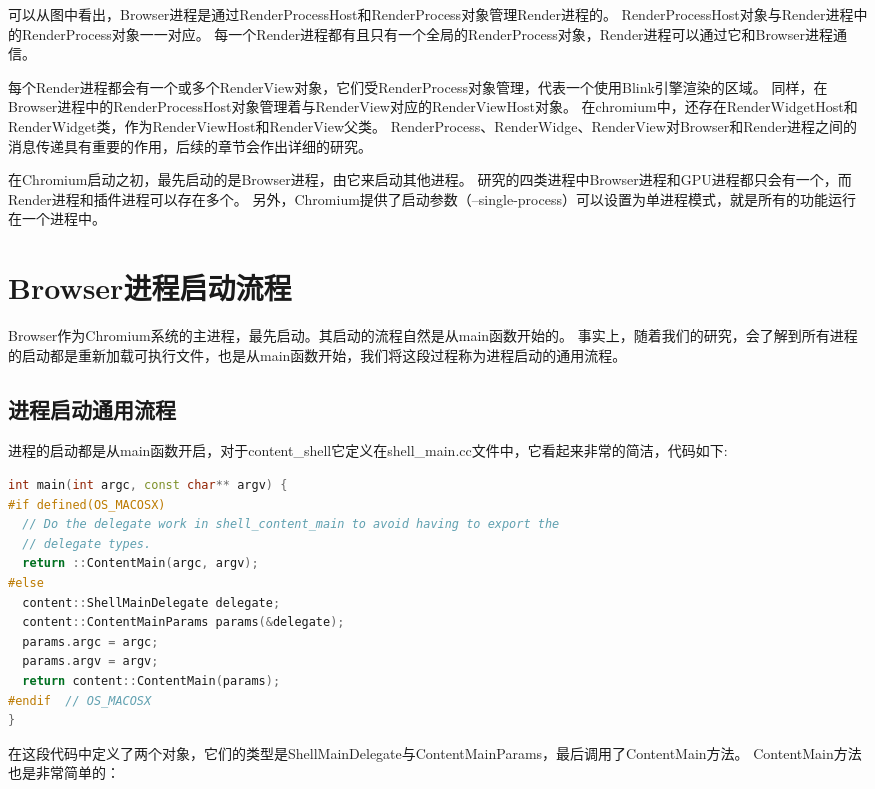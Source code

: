 可以从图中看出，Browser进程是通过RenderProcessHost和RenderProcess对象管理Render进程的。
RenderProcessHost对象与Render进程中的RenderProcess对象一一对应。
每一个Render进程都有且只有一个全局的RenderProcess对象，Render进程可以通过它和Browser进程通信。

每个Render进程都会有一个或多个RenderView对象，它们受RenderProcess对象管理，代表一个使用Blink引擎渲染的区域。
同样，在Browser进程中的RenderProcessHost对象管理着与RenderView对应的RenderViewHost对象。
在chromium中，还存在RenderWidgetHost和RenderWidget类，作为RenderViewHost和RenderView父类。
RenderProcess、RenderWidge、RenderView对Browser和Render进程之间的消息传递具有重要的作用，后续的章节会作出详细的研究。

在Chromium启动之初，最先启动的是Browser进程，由它来启动其他进程。
研究的四类进程中Browser进程和GPU进程都只会有一个，而Render进程和插件进程可以存在多个。
另外，Chromium提供了启动参数（--single-process）可以设置为单进程模式，就是所有的功能运行在一个进程中。

\section{Browser进程启动流程}
Browser作为Chromium系统的主进程，最先启动。其启动的流程自然是从main函数开始的。
事实上，随着我们的研究，会了解到所有进程的启动都是重新加载可执行文件，也是从main函数开始，我们将这段过程称为进程启动的通用流程。

\subsection{进程启动通用流程}
进程的启动都是从main函数开启，对于content\_shell它定义在shell\_main.cc文件中，它看起来非常的简洁，代码如下:

\begin{spacing}{1.0}
\begin{lstlisting}[language={C++}]
int main(int argc, const char** argv) {
#if defined(OS_MACOSX)
  // Do the delegate work in shell_content_main to avoid having to export the
  // delegate types.
  return ::ContentMain(argc, argv);
#else
  content::ShellMainDelegate delegate;
  content::ContentMainParams params(&delegate);
  params.argc = argc;
  params.argv = argv;
  return content::ContentMain(params);
#endif  // OS_MACOSX
}
\end{lstlisting}
\end{spacing}

在这段代码中定义了两个对象，它们的类型是ShellMainDelegate与ContentMainParams，最后调用了ContentMain方法。
ContentMain方法也是非常简单的：

